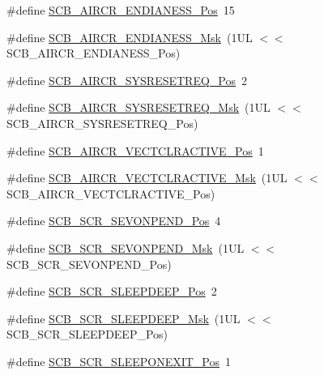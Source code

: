 \begin{DoxyCompactItemize}
\#define \mbox{\hyperlink{group___c_m_s_i_s___s_c_b_gad31dec98fbc0d33ace63cb1f1a927923}{S\+C\+B\+\_\+\+A\+I\+R\+C\+R\+\_\+\+E\+N\+D\+I\+A\+N\+E\+S\+S\+\_\+\+Pos}}~15
\item 
\#define \mbox{\hyperlink{group___c_m_s_i_s___s_c_b_ga2f571f93d3d4a6eac9a3040756d3d951}{S\+C\+B\+\_\+\+A\+I\+R\+C\+R\+\_\+\+E\+N\+D\+I\+A\+N\+E\+S\+S\+\_\+\+Msk}}~(1\+U\+L $<$$<$ S\+C\+B\+\_\+\+A\+I\+R\+C\+R\+\_\+\+E\+N\+D\+I\+A\+N\+E\+S\+S\+\_\+\+Pos)
\item 
\#define \mbox{\hyperlink{group___c_m_s_i_s___s_c_b_gaffb2737eca1eac0fc1c282a76a40953c}{S\+C\+B\+\_\+\+A\+I\+R\+C\+R\+\_\+\+S\+Y\+S\+R\+E\+S\+E\+T\+R\+E\+Q\+\_\+\+Pos}}~2
\item 
\#define \mbox{\hyperlink{group___c_m_s_i_s___s_c_b_gaae1181119559a5bd36e62afa373fa720}{S\+C\+B\+\_\+\+A\+I\+R\+C\+R\+\_\+\+S\+Y\+S\+R\+E\+S\+E\+T\+R\+E\+Q\+\_\+\+Msk}}~(1\+U\+L $<$$<$ S\+C\+B\+\_\+\+A\+I\+R\+C\+R\+\_\+\+S\+Y\+S\+R\+E\+S\+E\+T\+R\+E\+Q\+\_\+\+Pos)
\item 
\#define \mbox{\hyperlink{group___c_m_s_i_s___s_c_b_gaa30a12e892bb696e61626d71359a9029}{S\+C\+B\+\_\+\+A\+I\+R\+C\+R\+\_\+\+V\+E\+C\+T\+C\+L\+R\+A\+C\+T\+I\+V\+E\+\_\+\+Pos}}~1
\item 
\#define \mbox{\hyperlink{group___c_m_s_i_s___s_c_b_ga212c5ab1c1c82c807d30d2307aa8d218}{S\+C\+B\+\_\+\+A\+I\+R\+C\+R\+\_\+\+V\+E\+C\+T\+C\+L\+R\+A\+C\+T\+I\+V\+E\+\_\+\+Msk}}~(1\+U\+L $<$$<$ S\+C\+B\+\_\+\+A\+I\+R\+C\+R\+\_\+\+V\+E\+C\+T\+C\+L\+R\+A\+C\+T\+I\+V\+E\+\_\+\+Pos)
\item 
\#define \mbox{\hyperlink{group___c_m_s_i_s___s_c_b_ga3bddcec40aeaf3d3a998446100fa0e44}{S\+C\+B\+\_\+\+S\+C\+R\+\_\+\+S\+E\+V\+O\+N\+P\+E\+N\+D\+\_\+\+Pos}}~4
\item 
\#define \mbox{\hyperlink{group___c_m_s_i_s___s_c_b_gafb98656644a14342e467505f69a997c9}{S\+C\+B\+\_\+\+S\+C\+R\+\_\+\+S\+E\+V\+O\+N\+P\+E\+N\+D\+\_\+\+Msk}}~(1\+U\+L $<$$<$ S\+C\+B\+\_\+\+S\+C\+R\+\_\+\+S\+E\+V\+O\+N\+P\+E\+N\+D\+\_\+\+Pos)
\item 
\#define \mbox{\hyperlink{group___c_m_s_i_s___s_c_b_gab304f6258ec03bd9a6e7a360515c3cfe}{S\+C\+B\+\_\+\+S\+C\+R\+\_\+\+S\+L\+E\+E\+P\+D\+E\+E\+P\+\_\+\+Pos}}~2
\item 
\#define \mbox{\hyperlink{group___c_m_s_i_s___s_c_b_ga77c06a69c63f4b3f6ec1032e911e18e7}{S\+C\+B\+\_\+\+S\+C\+R\+\_\+\+S\+L\+E\+E\+P\+D\+E\+E\+P\+\_\+\+Msk}}~(1\+U\+L $<$$<$ S\+C\+B\+\_\+\+S\+C\+R\+\_\+\+S\+L\+E\+E\+P\+D\+E\+E\+P\+\_\+\+Pos)
\item 
\#define \mbox{\hyperlink{group___c_m_s_i_s___s_c_b_ga3680a15114d7fdc1e25043b881308fe9}{S\+C\+B\+\_\+\+S\+C\+R\+\_\+\+S\+L\+E\+E\+P\+O\+N\+E\+X\+I\+T\+\_\+\+Pos}}~1
$$
\end{DoxyCompactItemize}
